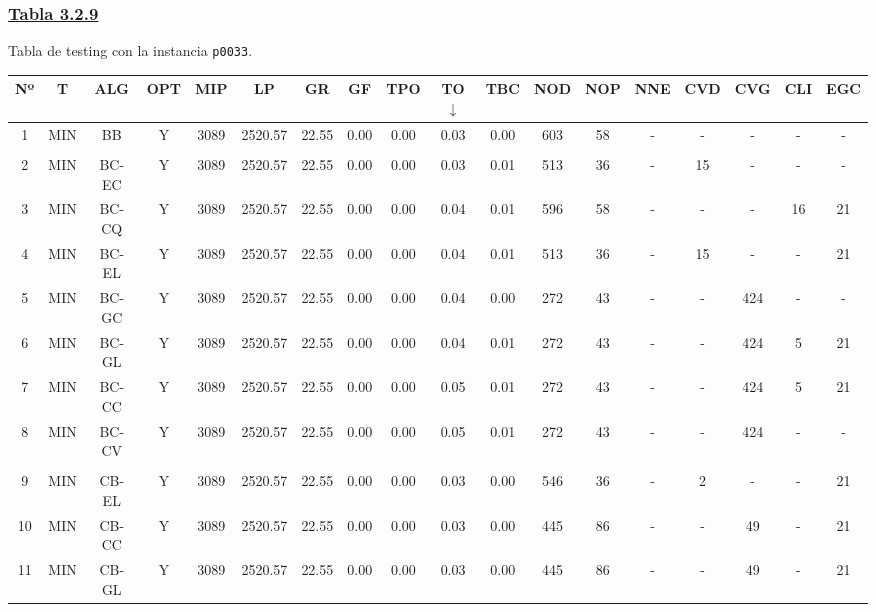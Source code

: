 \subsubsection*{\underline{Tabla 3.2.9}}
\noindent Tabla de testing con la instancia \verb_p0033_.\\

{
\footnotesize\centering
\hspace*{-5mm}\begin{tabular}{ *{17}{c|} c }
\hline
\textbf{Nº} & \textbf{T} & \textbf{ALG} & \textbf{OPT} & \textbf{MIP} & \textbf{LP} & \textbf{GR} & \textbf{GF} & \textbf{TPO} & \textbf{TO} $\downarrow$ & \textbf{TBC} & \textbf{NOD} & \textbf{NOP} & \textbf{NNE} & \textbf{CVD} & \textbf{CVG} & \textbf{CLI} & \textbf{EGC}\\
\hline
1 & MIN & BB & Y & 3089 & 2520.57 & 22.55 & 0.00 & 0.00 & 0.03 & 0.00 & 603 & 58 & - & - & - & - & -\\
\hline
\multicolumn{18}{c}{}
\\
\hline
2 & MIN & BC-EC & Y & 3089 & 2520.57 & 22.55 & 0.00 & 0.00 & 0.03 & 0.01 & 513 & 36 & - & 15 & - & - & -\\
\hline
3 & MIN & BC-CQ & Y & 3089 & 2520.57 & 22.55 & 0.00 & 0.00 & 0.04 & 0.01 & 596 & 58 & - & - & - & 16 & 21\\
\hline
4 & MIN & BC-EL & Y & 3089 & 2520.57 & 22.55 & 0.00 & 0.00 & 0.04 & 0.01 & 513 & 36 & - & 15 & - & - & 21\\
\hline
5 & MIN & BC-GC & Y & 3089 & 2520.57 & 22.55 & 0.00 & 0.00 & 0.04 & 0.00 & 272 & 43 & - & - & 424 & - & -\\
\hline
6 & MIN & BC-GL & Y & 3089 & 2520.57 & 22.55 & 0.00 & 0.00 & 0.04 & 0.01 & 272 & 43 & - & - & 424 & 5 & 21\\
\hline
7 & MIN & BC-CC & Y & 3089 & 2520.57 & 22.55 & 0.00 & 0.00 & 0.05 & 0.01 & 272 & 43 & - & - & 424 & 5 & 21\\
\hline
8 & MIN & BC-CV & Y & 3089 & 2520.57 & 22.55 & 0.00 & 0.00 & 0.05 & 0.01 & 272 & 43 & - & - & 424 & - & -\\
\hline
\multicolumn{18}{c}{}
\\
\hline
9 & MIN & CB-EL & Y & 3089 & 2520.57 & 22.55 & 0.00 & 0.00 & 0.03 & 0.00 & 546 & 36 & - & 2 & - & - & 21\\
\hline
10 & MIN & CB-CC & Y & 3089 & 2520.57 & 22.55 & 0.00 & 0.00 & 0.03 & 0.00 & 445 & 86 & - & - & 49 & - & 21\\
\hline
11 & MIN & CB-GL & Y & 3089 & 2520.57 & 22.55 & 0.00 & 0.00 & 0.03 & 0.00 & 445 & 86 & - & - & 49 & - & 21\\

\end{tabular}}
